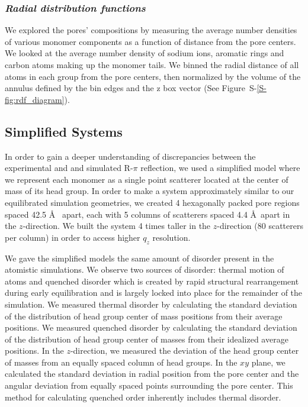 \documentclass[journal=jpcbfk,manuscript=article]{achemso}
\begin{document}
  
  \subsubsection{\textit{Radial distribution functions}}

  We explored the pores' compositions by measuring the average number densities
  of various monomer components as a function of distance from the pore centers.
  We looked at the average number density of sodium ions, aromatic rings and 
  carbon atoms making up the monomer tails. We binned the radial distance of all
  atoms in each group from the pore centers, then normalized by the volume of the
  annulus defined by the bin edges and the z box vector (See Figure~S-\ref{S-fig:rdf_diagram}). 

  \subsection{Simplified Systems}\label{method:simple_systems}
  
  In order to gain a deeper understanding of discrepancies between the experimental and
  and simulated R-$\pi$ reflection, we used a simplified model where we 
  represent each monomer as a single point scatterer located at the center of mass
  of its head group. In order to make a system approximately similar to our equilibrated 
  simulation geometries, we created 4 hexagonally packed pore regions spaced 42.5 \AA~ 
  apart, each with 5 columns of scatterers spaced 4.4 \AA~apart in the $z$-direction. We
  built the system 4 times taller in the $z$-direction (80 scatterers per column) in order
  to access higher $q_z$ resolution.
  
  We gave the simplified models the same amount of disorder present in the atomistic
  simulations. We observe two sources of disorder: thermal motion of atoms
  and quenched disorder which is created by rapid structural rearrangement during 
  early equilibration and is largely locked into place for the remainder of the 
  simulation. We measured thermal disorder by calculating the standard deviation of 
  the distribution of head group center of mass positions from their average positions.
  We measured quenched disorder by calculating the standard deviation of the distribution
  of head group center of masses from their idealized average positions. In the 
  $z$-direction, we measured the deviation of the head group center of masses from an
  equally spaced column of head groups. In the $xy$ plane, we calculated the standard 
  deviation in radial position from the pore center and the angular deviation from 
  equally spaced points surrounding the pore center. This method for calculating 
  quenched order inherently includes thermal disorder. 
  
\end{document}
